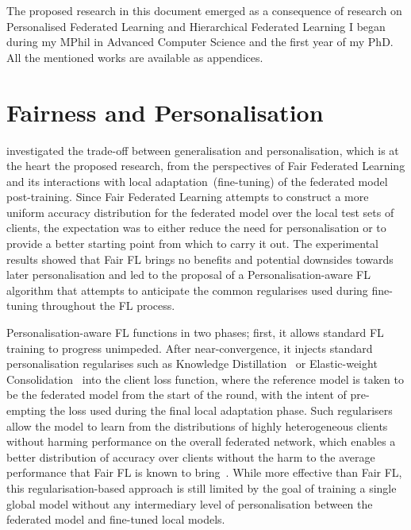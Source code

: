 The proposed research in this document emerged as a consequence of research on Personalised Federated Learning and Hierarchical Federated Learning I began during my MPhil in Advanced Computer Science and the first year of my PhD. All the mentioned works are available as appendices.

\section{Fairness and Personalisation}

\citet{EuroMLSysWorkshop} investigated the trade-off between generalisation and personalisation, which is at the heart the proposed research, from the perspectives of Fair Federated Learning and its interactions with local adaptation~(fine-tuning) of the federated model post-training. Since Fair Federated Learning attempts to construct a more uniform accuracy distribution for the federated model over the local test sets of clients, the expectation was to either reduce the need for personalisation or to provide a better starting point from which to carry it out. The experimental results showed that Fair FL brings no benefits and potential downsides towards later personalisation and led to the proposal of a Personalisation-aware FL algorithm that attempts to anticipate the common regularises used during fine-tuning throughout the FL process.

Personalisation-aware FL functions in two phases; first, it allows standard FL training to progress unimpeded. After near-convergence, it injects standard personalisation regularises such as Knowledge Distillation~\citep{DistillingKnowledgeInNeuralNetworks,DeepMutualLearning} or Elastic-weight Consolidation~\citep{EWC} into the client loss function, where the reference model is taken to be the federated model from the start of the round, with the intent of pre-empting the loss used during the final local adaptation phase. Such regularisers allow the model to learn from the distributions of highly heterogeneous clients without harming performance on the overall federated network, which enables a better distribution of accuracy over clients without the harm to the average performance that Fair FL is known to bring~\citep{QFedAvg,TERM}. While more effective than Fair FL, this regularisation-based approach is still limited by the goal of training a single global model without any intermediary level of personalisation between the federated model and fine-tuned local models.


